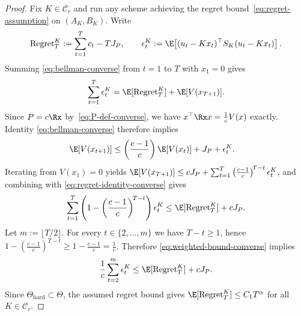 \documentclass[11pt,journal,onecolumn]{IEEEtran}
\begin{document}
\begin{proof}
\medskip
Fix $K\in\mathcal{C}_r$ and run any scheme achieving the regret bound~\eqref{eq:regret-assumption} on $(A_K,B_K)$. Write
\begin{equation}\label{eq:regret-eps-def}
    \mathrm{Regret}_T^K := \sum_{t=1}^T c_t - TJ_P,
    \qquad
    \epsilon_t^K := \E\!\left[(u_t-Kx_t)^\top S_K(u_t-Kx_t)\right].
\end{equation}
Summing \eqref{eq:bellman-converse} from $t=1$ to $T$ with $x_1=0$ gives
\begin{equation}
\label{eq:regret-identity-converse}
    \sum_{t=1}^T \epsilon_t^K
    =
    \E[\mathrm{Regret}_T^K] + \E[V(x_{T+1})].
\end{equation}
Since $P=c\Rx$ by~\eqref{eq:P-def-converse}, we have $x^\top \Rx x = \frac{1}{c} V(x)$ exactly. Identity \eqref{eq:bellman-converse} therefore implies
\begin{align}\label{eq:lyapunov-recursion}
    \E[V(x_{t+1})]
    &\le
    \left(\frac{c-1}{c}\right)\E[V(x_t)] + J_P + \epsilon_t^K.
\end{align}
Iterating from $V(x_1)=0$ yields
$\E[V(x_{T+1})]
\le
c J_P + \sum_{t=1}^T \left(\frac{c-1}{c}\right)^{\!T-t}\epsilon_t^K$,
and combining with \eqref{eq:regret-identity-converse} gives
\begin{equation}
\label{eq:weighted-bound-converse}
    \sum_{t=1}^T \left(1-\left(\frac{c-1}{c}\right)^{\!T-t}\right)\epsilon_t^K
    \le
    \E[\mathrm{Regret}_T^K] + c J_P.
\end{equation}
Let $m := \lfloor T/2\rfloor$.
For every $t\in\{2,\dots,m\}$ we have $T-t\ge 1$, hence $1-\left(\frac{c-1}{c}\right)^{T-t} \ge 1-\frac{c-1}{c} = \frac{1}{c}$.
Therefore \eqref{eq:weighted-bound-converse} implies
\begin{equation}
\label{eq:first-half-eps-converse}
    \frac{1}{c}\sum_{t=2}^m \epsilon_t^K
    \le
    \E[\mathrm{Regret}_T^K] + c J_P.
\end{equation}
Since $\Theta_{\mathrm{hard}}\subset \Theta$, the assumed regret bound gives $\E[\mathrm{Regret}_T^K] \le C_1 T^\alpha$ for all $K\in\mathcal{C}_r$.


\end{proof}
\end{document}
